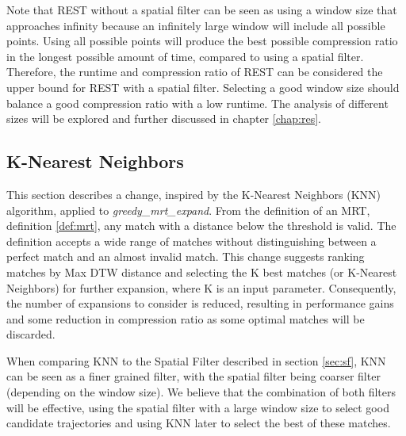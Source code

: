 Note that REST without a spatial filter can be seen as using a window size that approaches infinity because an infinitely large window will include all possible points. Using all possible points will produce the best possible compression ratio in the longest possible amount of time, compared to using a spatial filter. Therefore, the runtime and compression ratio of REST can be considered the upper bound for REST with a spatial filter. Selecting a good window size should balance a good compression ratio with a low runtime. The analysis of different sizes will be explored and further discussed in chapter \ref{chap:res}.



\subsection{K-Nearest Neighbors}
This section describes a change, inspired by the K-Nearest Neighbors (KNN) algorithm, applied to \textit{greedy\_mrt\_expand}. From the definition of an MRT, definition \ref{def:mrt}, any match with a distance below the threshold is valid. The definition accepts a wide range of matches without distinguishing between a perfect match and an almost invalid match. This change suggests ranking matches by Max DTW distance and selecting the K best matches (or K-Nearest Neighbors) for further expansion, where K is an input parameter. Consequently, the number of expansions to consider is reduced, resulting in performance gains and some reduction in compression ratio as some optimal matches will be discarded.

When comparing KNN to the Spatial Filter described in section \ref{sec:sf}, KNN can be seen as a finer grained filter, with the spatial filter being coarser filter (depending on the window size). We believe that the combination of both filters will be effective, using the spatial filter with a large window size to select good candidate trajectories and using KNN later to select the best of these matches.

